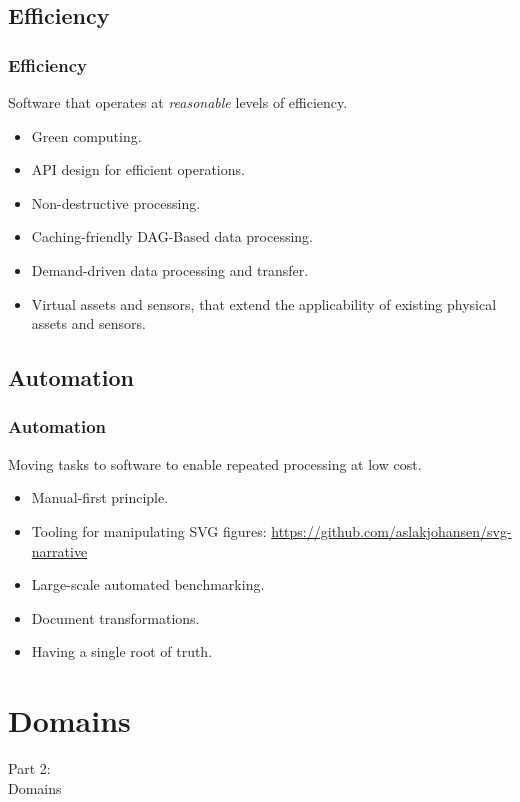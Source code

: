 \subsection{Efficiency}
\begin{frame}
    \frametitle{Efficiency}
    \vspace{3mm}
    Software that operates at \textsl{reasonable} levels of efficiency.
    \vspace{5mm}
    \begin{itemize}
        \item Green computing.
        \item API design for efficient operations.
        \item Non-destructive processing.
        \item Caching-friendly DAG-Based data processing.
        \item Demand-driven data processing and transfer.
        \item Virtual assets and sensors, that extend the applicability of existing physical assets and sensors.
    \end{itemize}
\end{frame}

\subsection{Automation}
\begin{frame}
    \frametitle{Automation}
    \vspace{3mm}
    Moving tasks to software to enable repeated processing at low cost.
    \vspace{5mm}
    \begin{itemize}
        \item Manual-first principle.
        \item Tooling for manipulating SVG figures:
          \url{https://github.com/aslakjohansen/svg-narrative}
        \item Large-scale automated benchmarking.
        \item Document transformations.
        \item Having a single root of truth.
    \end{itemize}
\end{frame}

\section{Domains}
\begin{frame}
    \vspace{25mm}
    \begin{center}
        \Huge{Part 2:\\Domains}
    \end{center}
\end{frame}

